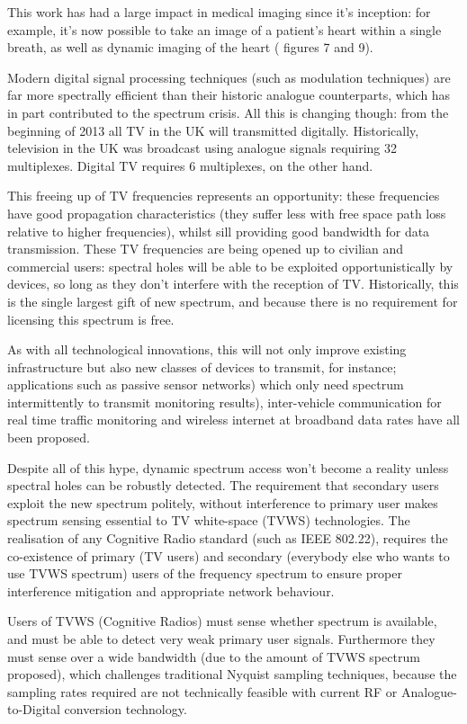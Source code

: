 This work has had a large impact in medical imaging since it's inception: for example, it's now possible to take an image of a patient's heart within a single breath, as well as dynamic imaging of the heart (\cite{Donoho} figures 7 and 9).

Modern digital signal processing techniques (such as modulation techniques) are far more spectrally efficient than their historic analogue counterparts, which has in part contributed to the spectrum crisis. All this is changing though: from the beginning of 2013 all TV in the UK will transmitted digitally. Historically, television in the UK was broadcast using analogue signals requiring 32 multiplexes. Digital TV requires 6 multiplexes, on the other hand. 

This freeing up of TV frequencies represents an opportunity: these frequencies have good propagation characteristics (they suffer less with free space path loss relative to higher frequencies), whilst sill providing good bandwidth for data transmission. These TV frequencies are being opened up to civilian and  commercial users: spectral holes will be able to be exploited opportunistically by devices, so long as they don't interfere with the reception of TV. Historically, this is the single largest gift of new spectrum, and because there is no requirement for licensing this spectrum is free.

As with all technological innovations, this will not only improve existing infrastructure but also new classes of devices to transmit, for instance; applications such as passive sensor networks) which only need spectrum intermittently to transmit monitoring results), inter-vehicle communication for real time traffic monitoring and wireless internet at broadband data rates have all been proposed.

Despite all of this hype, dynamic spectrum access won't become a reality unless spectral holes can be robustly detected. The requirement that secondary users exploit the new spectrum politely, without interference to primary user makes spectrum sensing essential to TV white-space (TVWS) technologies. The realisation of any Cognitive Radio standard (such as IEEE 802.22), requires the co-existence of primary (TV users) and secondary (everybody else who wants to use TVWS spectrum) users of the frequency spectrum to ensure proper interference mitigation and appropriate network behaviour. 

Users of TVWS (Cognitive Radios) must sense whether spectrum is available, and must be able to detect very weak primary user signals. Furthermore they must sense over a wide bandwidth (due to the amount of TVWS spectrum proposed), which challenges traditional Nyquist sampling techniques, because the sampling rates required are not technically feasible with current RF or Analogue-to-Digital conversion technology.

